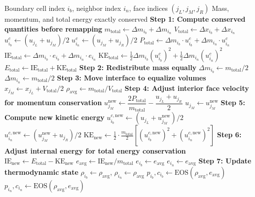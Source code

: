 \documentclass[12pt,a4paper]{article}
\begin{document}
\begin{algorithm}[H]
\caption{Conservative Cell Remapping}
\label{alg:remapping}
\begin{algorithmic}[1]
\Require Boundary cell index $i_b$, neighbor index $i_n$, face indices $(j_L, j_M, j_R)$
\Ensure Mass, momentum, and total energy exactly conserved
\State
\State \textbf{Step 1: Compute conserved quantities before remapping}
\State $m_{\text{total}} \gets \Delta m_{i_b} + \Delta m_{i_n}$
\State $V_{\text{total}} \gets \Delta x_{i_b} + \Delta x_{i_n}$
\State $u_{i_b}^c \gets (u_{j_L} + u_{j_M})/2$ 
\State $u_{i_n}^c \gets (u_{j_M} + u_{j_R})/2$
\State $P_{\text{total}} \gets \Delta m_{i_b} \cdot u_{i_b}^c + \Delta m_{i_n} \cdot u_{i_n}^c$ 
\State $\text{IE}_{\text{total}} \gets \Delta m_{i_b} \cdot e_{i_b} + \Delta m_{i_n} \cdot e_{i_n}$ 
\State $\text{KE}_{\text{total}} \gets \frac{1}{2}\Delta m_{i_b}(u_{i_b}^c)^2 + \frac{1}{2}\Delta m_{i_n}(u_{i_n}^c)^2$ 
\State $E_{\text{total}} \gets \text{IE}_{\text{total}} + \text{KE}_{\text{total}}$
\State
\State \textbf{Step 2: Redistribute mass equally}
\State $\Delta m_{i_b} \gets m_{\text{total}}/2$
\State $\Delta m_{i_n} \gets m_{\text{total}}/2$
\State
\State \textbf{Step 3: Move interface to equalize volumes}
\State $x_{j_M} \gets x_{j_L} + V_{\text{total}}/2$
\State $\rho_{\text{avg}} \gets m_{\text{total}} / V_{\text{total}}$
\State
\State \textbf{Step 4: Adjust interior face velocity for momentum conservation}
\State $u_{j_M}^{\text{new}} \gets \dfrac{2 P_{\text{total}}}{m_{\text{total}}} - \dfrac{u_{j_L} + u_{j_R}}{2}$
\State $u_{j_M} \gets u_{j_M}^{\text{new}}$
\State
\State \textbf{Step 5: Compute new kinetic energy}
\State $u_{i_b}^{c,\text{new}} \gets (u_{j_L} + u_{j_M}^{\text{new}})/2$
\State $u_{i_n}^{c,\text{new}} \gets (u_{j_M}^{\text{new}} + u_{j_R})/2$
\State $\text{KE}_{\text{new}} \gets \frac{1}{2}\cdot\frac{m_{\text{total}}}{2}\left[(u_{i_b}^{c,\text{new}})^2 + (u_{i_n}^{c,\text{new}})^2\right]$
\State
\State \textbf{Step 6: Adjust internal energy for total energy conservation}
\State $\text{IE}_{\text{new}} \gets E_{\text{total}} - \text{KE}_{\text{new}}$
\State $e_{\text{avg}} \gets \text{IE}_{\text{new}} / m_{\text{total}}$
\State $e_{i_b} \gets e_{\text{avg}}$
\State $e_{i_n} \gets e_{\text{avg}}$
\State
\State \textbf{Step 7: Update thermodynamic state}
\State $\rho_{i_b} \gets \rho_{\text{avg}}$, \quad $\rho_{i_n} \gets \rho_{\text{avg}}$
\State $p_{i_b}, c_{i_b} \gets \text{EOS}(\rho_{\text{avg}}, e_{\text{avg}})$
\State $p_{i_n}, c_{i_n} \gets \text{EOS}(\rho_{\text{avg}}, e_{\text{avg}})$
\end{algorithmic}
\end{algorithm}
\end{document}
